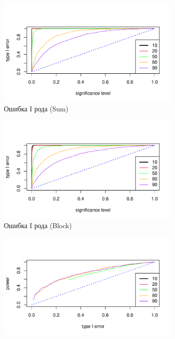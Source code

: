 \documentclass[specialist,
substylefile = spbu_report.rtx,
subf,href,colorlinks=true, 12pt]{disser}
\theoremstyle{definition}
\begin{document}
\begin{figure}[h!]
	\captionsetup[subfigure]{justification=Centering}
	\begin{subfigure}[t]{0.5\textwidth}
		\centering
		\includegraphics[width=\textwidth]{img/type1error_sum_fa_phi3.pdf}
		\caption{Ошибка I рода (Sum)}
	\end{subfigure}\hspace{\fill}
	\begin{subfigure}[t]{0.5\textwidth}
		\centering
		\includegraphics[width=\textwidth]{img/type1error_block_fa_phi3.pdf}
		\caption{Ошибка I рода (Block)}
	\end{subfigure}
	\bigskip
	\begin{subfigure}[t]{0.5\textwidth}
		\centering
		\includegraphics[width=\textwidth]{img/roc_sum_fa_phi3_omega0075.pdf}

\end{subfigure}
\end{figure}
\end{document}
